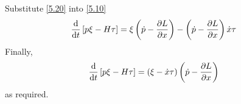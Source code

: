 Substitute \eqref{5.20} into \eqref{5.10}
\begin{align}
\label{5.21}
	\frac{\mathrm{d}}{\mathrm{d}t}\left[p\xi-H\tau\right]&=  \xi\left(\dot{p} -\frac{\partial L}{\partial x}\right) - \left(\dot{p} - \frac{\partial L}{\partial x}\right)\dot{x}\tau
\end{align}
Finally,
\begin{align}
\label{5.22}
	\frac{\mathrm{d}}{\mathrm{d}t}\left[p\xi-H\tau\right]&=  \left(\xi- \dot{x}\tau\right)\left(\dot{p} -\frac{\partial L}{\partial x}\right) 
\end{align}
as required.

